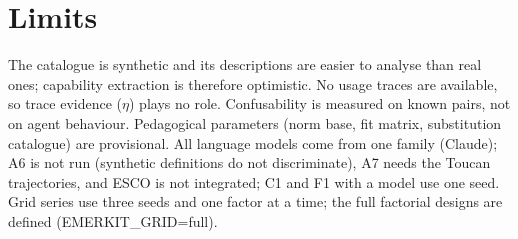 \documentclass[10pt]{article}
\begin{document}


\section{Limits}
The catalogue is synthetic and its descriptions are easier to analyse than real ones; capability extraction is therefore optimistic. No usage traces are available, so trace evidence ($\eta$) plays no role. Confusability is measured on known pairs, not on agent behaviour. Pedagogical parameters (norm base, fit matrix, substitution catalogue) are provisional. All language models come from one family (Claude); A6 is not run (synthetic definitions do not discriminate), A7 needs the Toucan trajectories, and ESCO is not integrated; C1 and F1 with a model use one seed. Grid series use three seeds and one factor at a time; the full factorial designs are defined (EMERKIT\_GRID=full).
\end{document}
